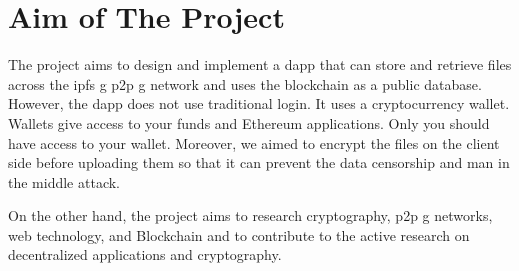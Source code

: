 \section{Aim of The Project}

The project aims to design and implement a \acrlong{dapp} that can store and retrieve files across the \gls{ipfs g} \gls{p2p g} network and uses the \Gls{blockchain} as a public database. However, the \acrlong{dapp} does not use traditional login. It uses a \gls{cryptocurrency} \gls{wallet}. Wallets give access to your funds and Ethereum applications. Only you should have access to your wallet. Moreover, we aimed to encrypt the files on the client side before uploading them so that it can prevent the data censorship and man in the middle attack.

On the other hand, the project aims to research cryptography, \gls{p2p g} networks, web technology, and Blockchain and to contribute to the active research on decentralized applications and cryptography.